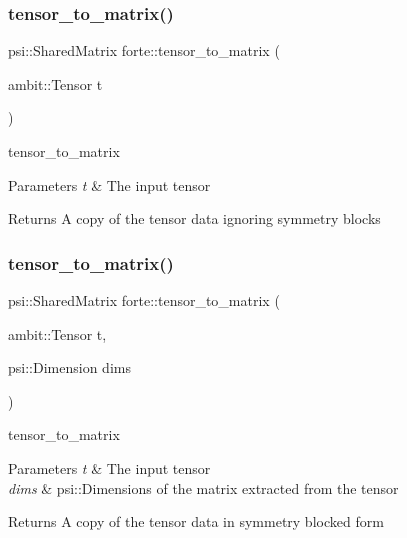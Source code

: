 \mbox{\label{namespaceforte_a39774aa3b62c28a0e541f5b1f7b71978}} 
\subsubsection{\texorpdfstring{tensor\+\_\+to\+\_\+matrix()}{tensor\_to\_matrix()}\hspace{0.1cm}{\footnotesize\ttfamily [1/2]}}
{\footnotesize\ttfamily psi\+::\+Shared\+Matrix forte\+::tensor\+\_\+to\+\_\+matrix (\begin{DoxyParamCaption}\item[{ambit\+::\+Tensor}]{t }\end{DoxyParamCaption})}



tensor\+\_\+to\+\_\+matrix 


\begin{DoxyParams}{Parameters}
{\em t} & The input tensor \\
\hline
\end{DoxyParams}
\begin{DoxyReturn}{Returns}
A copy of the tensor data ignoring symmetry blocks 
\end{DoxyReturn}
\mbox{\label{namespaceforte_ac7a0004529455021b87f71285e5cc19d}} 
\subsubsection{\texorpdfstring{tensor\+\_\+to\+\_\+matrix()}{tensor\_to\_matrix()}\hspace{0.1cm}{\footnotesize\ttfamily [2/2]}}
{\footnotesize\ttfamily psi\+::\+Shared\+Matrix forte\+::tensor\+\_\+to\+\_\+matrix (\begin{DoxyParamCaption}\item[{ambit\+::\+Tensor}]{t,  }\item[{psi\+::\+Dimension}]{dims }\end{DoxyParamCaption})}



tensor\+\_\+to\+\_\+matrix 


\begin{DoxyParams}{Parameters}
{\em t} & The input tensor \\
\hline
{\em dims} & psi\+::\+Dimensions of the matrix extracted from the tensor \\
\hline
\end{DoxyParams}
\begin{DoxyReturn}{Returns}
A copy of the tensor data in symmetry blocked form 
\end{DoxyReturn}
\mbox{\label{namespaceforte_aa00ed61bfd56818bbdf24b06bb2f4e87}} 
